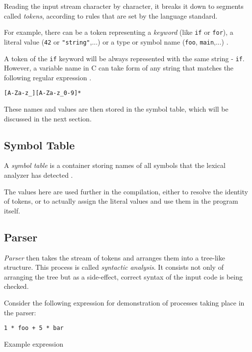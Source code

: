             Reading the input stream character by character, it breaks it down to segments called \emph{tokens}, according to rules that are set by the language standard.

            For example, there can be a token representing a \emph{keyword} (like \texttt{if} or \texttt{for}), a literal value (\texttt{42} or \verb'"string"',...) or a type or symbol name (\texttt{foo}, \texttt{main},...) \cite{DragonBook}.

            A token of the \texttt{if} keyword will be always represented with the same string - \texttt{if}. However, a variable name in C can take form of any string that matches the following regular expression \cite{C99}.

            \begin{center}\texttt{[A-Za-z\_][A-Za-z\_0-9]*}\end{center}

            These names and values are then stored in the symbol table, which will be discussed in the next section.

        \subsection{Symbol Table}

            A \emph{symbol table} is a container storing names of all symbols that the lexical analyzer has detected \cite{DragonBook}.

            The values here are used further in the compilation, either to resolve the identity of tokens, or to actually assign the literal values and use them in the program itself.

        \subsection{Parser}

            \emph{Parser} then takes the stream of tokens and arranges them into a tree-like structure. This process is called \emph{syntactic analysis}. It consists not only of arranging the tree but as a side-effect, correct syntax of the input code is being checked.

            Consider the following expression for demonstration of processes taking place in the parser:

            \begin{listing}
            \centering
            \texttt{1 * foo + 5 * bar}
            \caption{Example expression}\label{lst:expr}
            \end{listing}

